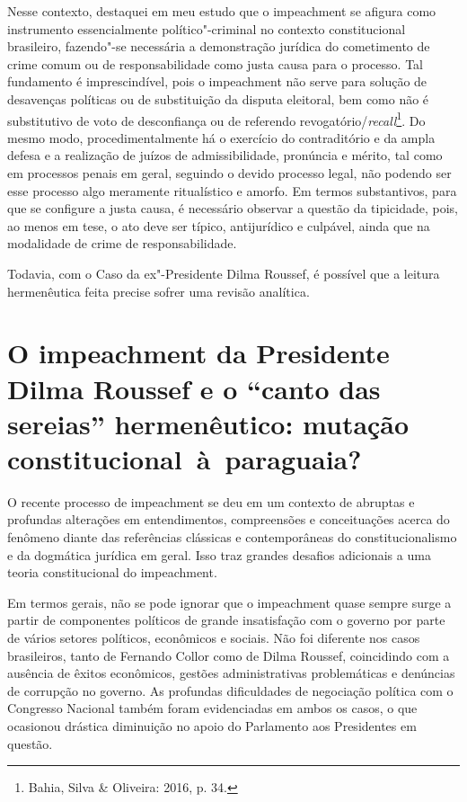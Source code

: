 Nesse contexto, destaquei em meu estudo que o impeachment se
afigura como instrumento essencialmente político"-criminal no contexto
constitucional brasileiro, fazendo"-se necessária a demonstração jurídica
do cometimento de crime comum ou de responsabilidade como justa causa
para o processo. Tal fundamento é imprescindível, pois o
impeachment não serve para solução de desavenças políticas ou de
substituição da disputa eleitoral, bem como não é substitutivo de voto
de desconfiança ou de referendo revogatório/\emph{recall}\footnote{Bahia, Silva
\& Oliveira: 2016, p. 34.}. Do mesmo modo, procedimentalmente há o
exercício do contraditório e da ampla defesa e a realização de juízos de
admissibilidade, pronúncia e mérito, tal como em processos penais em
geral, seguindo o devido processo legal, não podendo ser esse processo
algo meramente ritualístico e amorfo. Em termos substantivos, para que
se configure a justa causa, é necessário observar a questão da
tipicidade, pois, ao menos em tese, o ato deve ser típico, antijurídico
e culpável, ainda que na modalidade de crime de responsabilidade.

Todavia, com o Caso da ex"-Presidente Dilma Roussef, é possível que a
leitura hermenêutica feita precise sofrer uma revisão analítica.

\section{O impeachment da Presidente Dilma Roussef e o ``canto
  das sereias'' hermenêutico: mutação constitucional~à~paraguaia?}


O recente processo de impeachment se deu em um contexto de
abruptas e profundas alterações em entendimentos, compreensões e
conceituações acerca do fenômeno diante das referências clássicas e
contemporâneas do constitucionalismo e da dogmática jurídica em geral.
Isso traz grandes desafios adicionais a uma teoria constitucional do
impeachment.

Em termos gerais, não se pode ignorar que o impeachment quase
sempre surge a partir de componentes políticos de grande insatisfação
com o governo por parte de vários setores políticos, econômicos e
sociais. Não foi diferente nos casos brasileiros, tanto de Fernando
Collor como de Dilma Roussef, coincidindo com a ausência de êxitos
econômicos, gestões administrativas problemáticas e denúncias de
corrupção no governo. As profundas dificuldades de negociação política
com o Congresso Nacional também foram evidenciadas em ambos os casos, o
que ocasionou drástica diminuição no apoio do Parlamento aos Presidentes
em questão.

